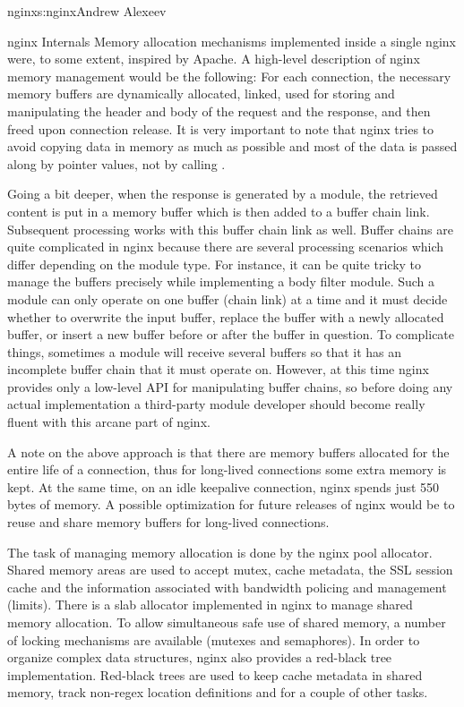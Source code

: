 \begin{aosachapter}{nginx}{s:nginx}{Andrew Alexeev}
\begin{aosasect1}{nginx Internals}
Memory allocation mechanisms implemented inside a single nginx
 were, to some extent, inspired by Apache. A high-level
description of nginx memory management would be the following: For
each connection, the necessary memory buffers are dynamically
allocated, linked, used for storing and manipulating the header and
body of the request and the response, and then freed upon connection
release. It is very important to note that nginx tries to avoid
copying data in memory as much as possible and most of the data is
passed along by pointer values, not by calling .

Going a bit deeper, when the response is generated by a module, the
retrieved content is put in a memory buffer which is then added to a
buffer chain link. Subsequent processing works with this buffer chain
link as well. Buffer chains are quite complicated in nginx because
there are several processing scenarios which differ depending on the module
type. For instance, it can be quite tricky to manage the buffers
precisely while implementing a body filter module. Such a module can
only operate on one buffer (chain link) at a time and it must decide
whether to overwrite the input buffer, replace the buffer with a newly
allocated buffer, or insert a new buffer before or after the buffer in
question. To complicate things, sometimes a module will receive
several buffers so that it has an incomplete buffer chain that it must
operate on. However, at this time nginx provides only a low-level API
for manipulating buffer chains, so before doing any actual
implementation a third-party module developer should become really
fluent with this arcane part of nginx.

A note on the above approach is that there are memory buffers allocated for the
entire life of a connection, thus for long-lived connections some extra memory
is kept. At the same time, on an idle keepalive connection, nginx spends
just 550 bytes of memory. A possible optimization for future releases of nginx
would be to reuse and share memory buffers for long-lived connections.

The task of managing memory allocation is done by the nginx pool
allocator. Shared memory areas are used to accept mutex, cache
metadata, the SSL session cache and the information associated with
bandwidth policing and management (limits). There is a slab allocator
implemented in nginx to manage shared memory allocation. To allow
simultaneous safe use of shared memory, a number of locking mechanisms
are available (mutexes and semaphores). In order to organize complex
data structures, nginx also provides a red-black tree
implementation. Red-black trees are used to keep cache metadata in
shared memory, track non-regex location definitions and for a couple of
other tasks.


\end{aosasect1}
\end{aosachapter}
